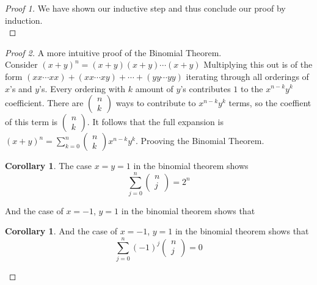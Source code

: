 \documentclass[11pt]{article}
\theoremstyle{definition}
\newtheorem{corollary}[theorem]{Corollary}
\begin{document}
\begin{proof}[Proof 1]
We have shown our inductive step and thus conclude our proof by induction.\\
\end{proof}
\begin{proof}[Proof 2] A more intuitive proof of the Binomial Theorem.\\
    Consider ${(x+y)}^n=(x+y)(x+y)\cdots(x+y)$ Multiplying this out is of the form $(xx\cdots xx) + (xx\cdots xy) + \cdots + (yy \cdots yy)$ iterating through all orderings of $x$'s and $y$'s. Every ordering with $k$ amount of $y$'s contributes $1$ to the $x^{n-k}y^k$ coefficient. There are $(\begin{smallmatrix} n \\ k \end{smallmatrix})$ ways to contribute to $x^{n-k}y^k$ terms, so the coeffient of this term is $(\begin{smallmatrix} n \\ k \end{smallmatrix})$. It follows that the full expansion is 
        $(x+y)^n = \sum_{k=0}^n
        (\begin{smallmatrix} n \\ k \end{smallmatrix})x^{n-k}y^k$. Prooving the Binomial Theorem.
\begin{corollary}
The case $x=y=1$ in the binomial theorem shows
\begin{equation*}
    \sum\limits_{j=0}^n \begin{pmatrix} n \\ j \end{pmatrix}=2^n
\end{equation*}
\end{corollary}
And the case of $x=-1$, $y=1$ in the binomial theorem shows that
\begin{corollary}
And the case of $x=-1$, $y=1$ in the binomial theorem shows that
\begin{equation*}
\sum\limits_{j=0}^n (-1)^j \begin{pmatrix} n \\ j \end{pmatrix}=0
\end{equation*}
\end{corollary}
\end{proof}
\end{document}
